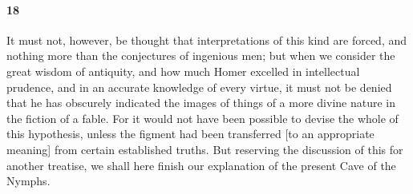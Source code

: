 \documentclass[a4paper,12pt]{article}
\begin{document}
\paragraph{18} It must not, however, be thought that interpretations of this
kind are forced, and nothing more than the conjectures of ingenious men; but
when we consider the great wisdom of antiquity, and how much Homer excelled in
intellectual prudence, and in an accurate knowledge of every virtue, it must
not be denied that he has obscurely indicated the images of things of a more
divine nature in the fiction of a fable. For it would not have been possible to
devise the whole of this hypothesis, unless the figment had been transferred
[to an appropriate meaning] from certain established truths. But reserving the
discussion of this for another treatise, we shall here finish our explanation
of the present Cave of the Nymphs.
\end{document}
